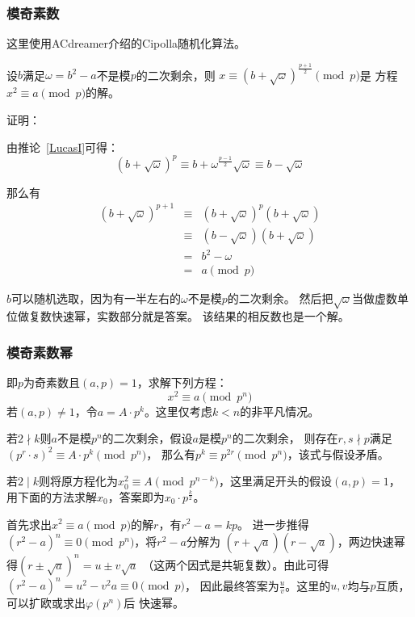 \subsubsection{模奇素数}
这里使用ACdreamer介绍的Cipolla随机化算法。
\begin{theorem}
    设$b$满足$\omega=b^2-a$不是模$p$的二次剩余，则
    $x\equiv (b+\sqrt{\omega})^\frac{p+1}{2}\pmod{p}$是
    方程$x^2\equiv a\pmod{p}$的解。
\end{theorem}
证明：

由推论~\ref{LucasI}可得：
\begin{displaymath}
    (b+\sqrt{\omega})^p\equiv b+\omega^\frac{p-1}{2}\sqrt{\omega}
    \equiv b-\sqrt{\omega}
\end{displaymath}

那么有
\begin{eqnarray*}
    (b+\sqrt{\omega})^{p+1}&\equiv&(b+\sqrt{\omega})^p(b+\sqrt{\omega})\\
    &\equiv&(b-\sqrt{\omega})(b+\sqrt{\omega})\\
    &=&b^2-\omega\\
    &=&a \pmod{p}
\end{eqnarray*}

$b$可以随机选取，因为有一半左右的$\omega$不是模$p$的二次剩余。
然后把$\sqrt{\omega}$当做虚数单位做复数快速幂，实数部分就是答案。
该结果的相反数也是一个解。
\subsubsection{模奇素数幂}
即$p$为奇素数且$(a,p)=1$，求解下列方程：
\begin{displaymath}
	x^2\equiv a \pmod{p^n}
\end{displaymath}
若$(a,p)\neq 1$，令$a=A\cdot p^k$。这里仅考虑$k<n$的非平凡情况。

若$2\nmid k$则$a$不是模$p^n$的二次剩余，假设$a$是模$p^n$的二次剩余，
则存在$r,s\nmid p$满足$(p^r\cdot s)^2\equiv A\cdot p^k\pmod{p^n}$，
那么有$p^k\equiv p^{2r}\pmod{p^n}$，该式与假设矛盾。

若$2\mid k$则将原方程化为$x_0^2\equiv A \pmod{p^{n-k}}$，这里满足开头的假设$(a,p)=1$，
用下面的方法求解$x_0$，答案即为$x_0\cdot p^\frac{k}{2}$。

首先求出$x^2\equiv a \pmod{p}$的解$r$，有$r^2-a=kp$。
进一步推得$(r^2-a)^n\equiv 0 \pmod{p^n}$，将$r^2-a$分解为
$(r+\sqrt{a})(r-\sqrt{a})$，两边快速幂得$(r\pm\sqrt{a})^n=u\pm v\sqrt{a}$
（这两个因式是共轭复数）。由此可得$(r^2-a)^n=u^2-v^2a\equiv 0\pmod{p}$，
因此最终答案为$\frac{u}{v}$。这里的$u,v$均与$p$互质，可以扩欧或求出$\varphi(p^n)$后
快速幂。
